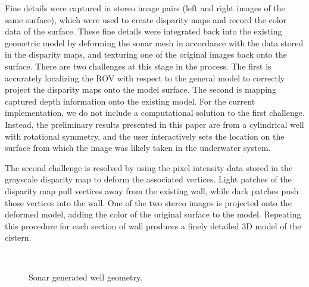 \documentclass{llncs}
\begin{document}
Fine details were captured in stereo image pairs (left and right images of the same surface), which were used to create disparity maps and record the color data of the surface.
These fine details were integrated back into the existing geometric model by deforming the sonar mesh in accordance with the data stored in the disparity maps, and texturing one of the original images back onto the surface.
There are two challenges at this stage in the process. The first is accurately localizing the ROV with respect to the general model to correctly project the disparity maps onto the model surface. The second is mapping captured depth information onto the existing model.
For the current implementation, we do not include a computational solution to the first challenge. 
Instead, the preliminary results presented in this paper are from a cylindrical well with rotational symmetry, and the user interactively sets the location on the surface from which the image was likely taken in the underwater system.

The second challenge is resolved by using the pixel intensity data stored in the grayscale disparity map to deform the associated vertices.
Light patches of the disparity map pull vertices away from the existing wall, while dark patches push those vertices into the wall.
One of the two stereo images is projected onto the deformed model, adding the color of the original surface to the model. Repeating this procedure for each section of wall produces a finely detailed 3D model of the cistern.

\begin{figure}[!h]
	\centering
		\quad %
		\\%

		\caption{Sonar generated well geometry.}
		\label{fig:wellNoFine}
\end{figure}
\end{document}
